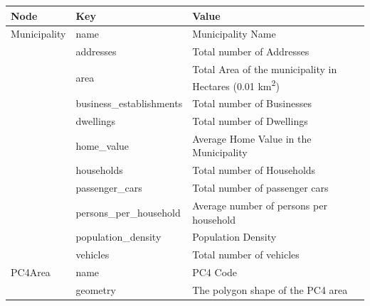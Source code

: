 \documentclass{article}
\begin{document}
\begin{table}[H]
	\begin{tabularx}{\textwidth}{l|l|X}
		\textbf{Node}     & \textbf{Key}             & \textbf{Value}                                                          \\
		\hline
		Municipality      & name                     & Municipality Name                                                       \\
		\cline{2-3}
		                  & addresses                & Total number of Addresses                                               \\
		\cline{2-3}
		                  & area                     & Total Area of the municipality in Hectares (0.01 km\textsuperscript{2}) \\
		\cline{2-3}
		                  & business\_establishments & Total number of Businesses                                              \\
		\cline{2-3}
		                  & dwellings                & Total number of Dwellings                                               \\
		\cline{2-3}
		                  & home\_value              & Average Home Value in the Municipality                                  \\
		\cline{2-3}
		                  & households               & Total number of Households                                              \\
		\cline{2-3}
		                  & passenger\_cars          & Total number of passenger cars                                          \\
		\cline{2-3}
		                  & persons\_per\_household  & Average number of persons per household                                 \\
		\cline{2-3}
		                  & population\_density      & Population Density                                                      \\
		\cline{2-3}
		                  & vehicles                 & Total number of vehicles                                                \\
		\hline
		PC4Area           & name                     & PC4 Code                                                                \\
		\cline{2-3}
		                  & geometry                 & The polygon shape of the PC4 area                                       \\

\end{tabularx}
\end{table}
\end{document}
